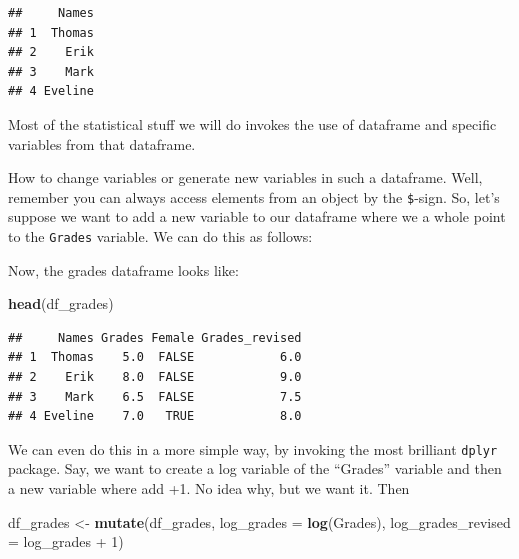 \documentclass[]{article}
\newenvironment{Shaded}{\begin{snugshade}}{\end{snugshade}}
\newcommand{\KeywordTok}[1]{\textcolor[rgb]{0.13,0.29,0.53}{\textbf{{#1}}}}
\newcommand{\DataTypeTok}[1]{\textcolor[rgb]{0.13,0.29,0.53}{{#1}}}
\newcommand{\DecValTok}[1]{\textcolor[rgb]{0.00,0.00,0.81}{{#1}}}
\newcommand{\StringTok}[1]{\textcolor[rgb]{0.31,0.60,0.02}{{#1}}}
\newcommand{\NormalTok}[1]{{#1}}
\begin{document}
\begin{verbatim}
##     Names
## 1  Thomas
## 2    Erik
## 3    Mark
## 4 Eveline
\end{verbatim}

Most of the statistical stuff we will do invokes the use of dataframe
and specific variables from that dataframe.

How to change variables or generate new variables in such a dataframe.
Well, remember you can always access elements from an object by the
\texttt{\$}-sign. So, let's suppose we want to add a new variable to our
dataframe where we a whole point to the \texttt{Grades} variable. We can
do this as follows:

\begin{Shaded}
\end{Shaded}

Now, the grades dataframe looks like:

\begin{Shaded}
\begin{Highlighting}[]
\KeywordTok{head}\NormalTok{(df_grades)}
\end{Highlighting}
\end{Shaded}

\begin{verbatim}
##     Names Grades Female Grades_revised
## 1  Thomas    5.0  FALSE            6.0
## 2    Erik    8.0  FALSE            9.0
## 3    Mark    6.5  FALSE            7.5
## 4 Eveline    7.0   TRUE            8.0
\end{verbatim}

We can even do this in a more simple way, by invoking the most brilliant
\texttt{dplyr} package. Say, we want to create a log variable of the
``Grades'' variable and then a new variable where add +1. No idea why,
but we want it. Then

\begin{Shaded}
\begin{Highlighting}[]
\NormalTok{df_grades <-}\StringTok{ }\KeywordTok{mutate}\NormalTok{(df_grades, }
               \DataTypeTok{log_grades =} \KeywordTok{log}\NormalTok{(Grades),}
               \DataTypeTok{log_grades_revised =} \NormalTok{log_grades +}\StringTok{ }\DecValTok{1}\NormalTok{)}
\end{Highlighting}
\end{Shaded}
\end{document}
